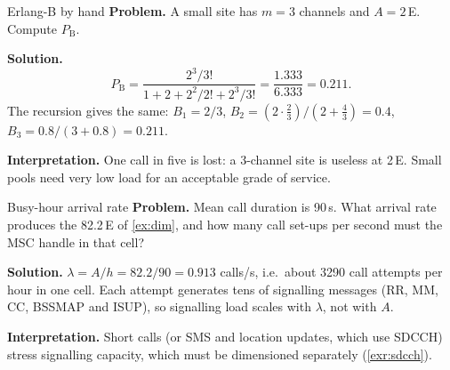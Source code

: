 \documentclass[11pt,a4paper]{article}
\begin{document}
\begin{examplebox}{Erlang-B by hand}\label{ex:hand}
\textbf{Problem.} A small site has $m=3$ channels and $A=2$\,E. Compute $P_{\mathrm{B}}$.

\textbf{Solution.}
\begin{equation*}
  P_{\mathrm{B}} = \frac{2^3/3!}{1 + 2 + 2^2/2! + 2^3/3!}
  = \frac{1.333}{6.333} = 0.211 .
\end{equation*}
The recursion gives the same: $B_1 = 2/3$, $B_2 = (2\cdot\tfrac23)/(2+\tfrac43) = 0.4$,
$B_3 = 0.8/(3+0.8) = 0.211$.

\textbf{Interpretation.} One call in five is lost: a 3-channel site is useless at 2\,E.
Small pools need very low load for an acceptable grade of service.
\end{examplebox}

\begin{examplebox}{Busy-hour arrival rate}\label{ex:lambda}
\textbf{Problem.} Mean call duration is 90\,s. What arrival rate produces the 82.2\,E of
\cref{ex:dim}, and how many call set-ups per second must the MSC handle in that cell?

\textbf{Solution.} $\lambda = A/h = 82.2/90 = 0.913$ calls/s, i.e.\ about 3290 call attempts
per hour in one cell. Each attempt generates tens of signalling messages (RR, MM, CC,
BSSMAP and ISUP), so signalling load scales with $\lambda$, not with $A$.

\textbf{Interpretation.} Short calls (or SMS and location updates, which use SDCCH)
stress signalling capacity, which must be dimensioned separately (\cref{exr:sdcch}).
\end{examplebox}

\end{document}
